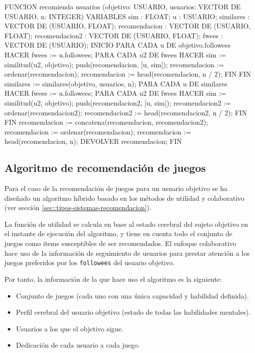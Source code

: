 \begin{listing}[caption=Algoritmo de recomendación de usuarios, label=pseudocodigo:recomendacion-usuarios]
FUNCION recomienda usuarios (objetivo: USUARIO, usuarios: VECTOR DE USUARIO, n: INTEGER)
VARIABLES
    sim : FLOAT;
    u : USUARIO;
    similares : VECTOR DE (USUARIO, FLOAT);
    recomendacion : VECTOR DE (USUARIO, FLOAT);
    recomendacion2 : VECTOR DE (USUARIO, FLOAT);
    fwees : VECTOR DE (USUARIO);
INICIO
    PARA CADA u DE objetivo.followees HACER
        fwees := u.followees;
        PARA CADA u2 DE fwees HACER
            sim := similitud(u2, objetivo);
            push(recomendacion, [u, sim]);
            recomendacion := ordenar(recomendacion);
            recomendacion := head(recomendacion, n / 2);
        FIN
    FIN
    similares := similares(objetivo, usuarios, n);
    PARA CADA u DE similares HACER
        fwees := u.followees;
        PARA CADA u2 DE fwees HACER
            sim := similitud(u2, objetivo);
            push(recomendacion2, [u, sim]);
            recomendacion2 := ordenar(recomendacion2);
            recomendacion2 := head(recomendacion2, n / 2);
        FIN
    FIN
    recomendacion := concatena(recomendacion, recomendacion2);
    recomendacion := ordenar(recomendacion);
    recomendacion := head(recomendacion, n);
    DEVOLVER recomendacion;
FIN
\end{listing}

\subsection{Algoritmo de recomendación de juegos}

Para el caso de la recomendación de juegos para un usuario objetivo se ha diseñado un algoritmo híbrido basado en los métodos de utilidad y colaborativo (ver sección \ref{sec::tipos-sistemas-recomendacion}).

La función de utilidad se calcula en base al estado cerebral del sujeto objetivo en el instante de ejecución del algoritmo, y tiene en cuenta todo el conjunto de juegos como items susceptibles de ser recomendados. El enfoque colaborativo hace uso de la información de seguimiento de usuarios para prestar atención a los juegos preferidos por los {\tt followees} del usuario objetivo.

Por tanto, la información de la que hace uso el algoritmo es la siguiente:

\begin{itemize}
\item Conjunto de juegos (cada uno con una única capacidad y habilidad definida).
\item Perfil cerebral del usuario objetivo (estado de todas las habilidades mentales).
\item Usuarios a los que el objetivo sigue.
\item Dedicación de cada usuario a cada juego.
\end{itemize}

